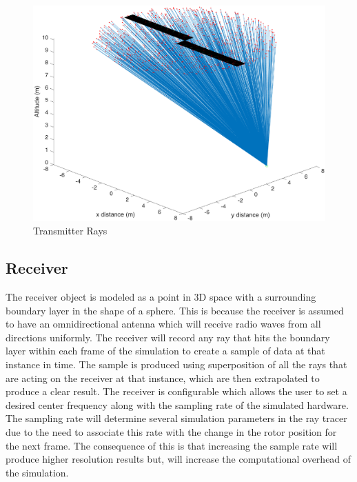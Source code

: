 \begin{figure}
	\begin{center}
		\includegraphics[width=15cm]{images/radio_propagation/transmitted.eps}
		\caption{Transmitter Rays}
		\label{fig:transmitter_direction}
	\end{center}
\end{figure}

\subsection{Receiver}
The receiver object is modeled as a point in 3D space with a surrounding boundary layer in the shape of a sphere. This is because the receiver is assumed to have an omnidirectional antenna which will receive radio waves from all directions uniformly. The receiver will record any ray that hits the boundary layer within each frame of the simulation to create a sample of data at that instance in time.
The sample is produced using superposition of all the rays that are acting on the receiver at that instance, which are then extrapolated to produce a clear result.
The receiver is configurable which allows the user to set a desired center frequency along with the sampling rate of the simulated hardware. The sampling rate will determine several simulation parameters in the ray tracer due to the need to associate this rate with the change in the rotor position for the next frame. The consequence of this is that increasing the sample rate will produce higher resolution results but, will increase the computational overhead of the simulation.

